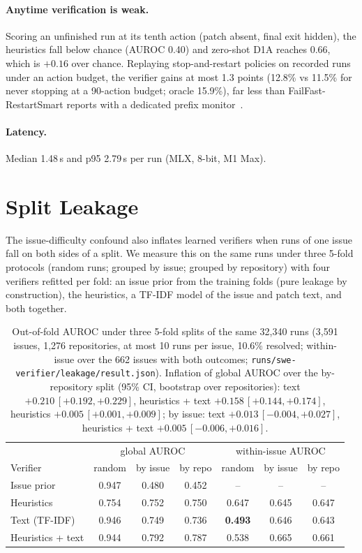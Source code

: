 \documentclass[11pt]{article}
\begin{document}
\paragraph{Anytime verification is weak.} Scoring an unfinished run at its tenth action (patch absent, final exit hidden), the heuristics fall below chance
(AUROC 0.40) and zero-shot D1A reaches 0.66, which is $+0.16$ over chance. Replaying stop-and-restart policies on recorded runs under an action budget, the
verifier gains at most 1.3 points (12.8\% vs 11.5\% for never stopping at a 90-action budget; oracle 15.9\%), far less than FailFast-RestartSmart reports
with a dedicated prefix monitor~\cite{failfast}.

\paragraph{Latency.} Median 1.48\,s and p95 2.79\,s per run (MLX, 8-bit, M1 Max).

\section{Split Leakage}\label{sec:leakage}
The issue-difficulty confound also inflates learned verifiers when runs of one issue fall on both sides of a split. We measure this on the same runs under three
5-fold protocols (random runs; grouped by issue; grouped by repository) with four verifiers refitted per fold: an issue prior from the training folds (pure
leakage by construction), the heuristics, a TF-IDF model of the issue and patch text, and both together.

\begin{table}[h]\centering\small
\begin{tabular}{lcccccc}\toprule
& \multicolumn{3}{c}{global AUROC} & \multicolumn{3}{c}{within-issue AUROC} \\
Verifier & random & by issue & by repo & random & by issue & by repo \\\midrule
Issue prior & 0.947 & 0.480 & 0.452 & -- & -- & -- \\
Heuristics & 0.754 & 0.752 & 0.750 & 0.647 & 0.645 & 0.647 \\
Text (TF-IDF) & 0.946 & 0.749 & 0.736 & \textbf{0.493} & 0.646 & 0.643 \\
Heuristics + text & 0.944 & 0.792 & 0.787 & 0.538 & 0.665 & 0.661 \\\bottomrule
\end{tabular}
\caption{Out-of-fold AUROC under three 5-fold splits of the same 32{,}340 runs (3{,}591 issues, 1{,}276 repositories, at most 10 runs per issue, 10.6\% resolved;
within-issue over the 662 issues with both outcomes; \texttt{runs/swe-verifier/leakage/result.json}). Inflation of global AUROC over the by-repository split
(95\% CI, bootstrap over repositories): text $+0.210\,[+0.192, +0.229]$, heuristics + text $+0.158\,[+0.144, +0.174]$, heuristics $+0.005\,[+0.001, +0.009]$;
by issue: text $+0.013\,[-0.004, +0.027]$, heuristics + text $+0.005\,[-0.006, +0.016]$.}\label{tab:leakage}
\end{table}
\end{document}
